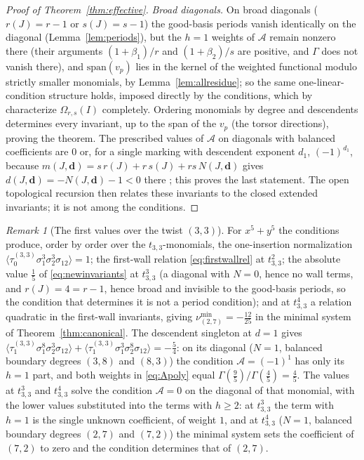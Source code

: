 \documentclass[11pt]{amsart}
\theoremstyle{definition}
\theoremstyle{remark}
\newtheorem{remark}[theorem]{Remark}
\newcommand{\Ascr}{\mathcal{A}}
\newcommand{\Om}{\Omega_{r,s}}
\begin{document}
\begin{proof}[Proof of Theorem~\ref{thm:effective}]
\emph{Broad diagonals.}
On broad
diagonals ($r(J)=r-1$ or $s(J)=s-1$) the good-basis periods vanish identically
on the diagonal (Lemma~\ref{lem:periods}), but the $h=1$ weights of $\Ascr$
remain nonzero there (their arguments $(1+\beta_1)/r$ and $(1+\beta_2)/s$ are
positive, and $\Gamma$ does not vanish there), and $\mathrm{span}(v_{p})$ lies in the
kernel of the weighted functional modulo strictly smaller monomials, by
Lemma~\ref{lem:allresidue}; so the same
one-linear-condition structure holds, imposed directly by the conditions,
which by \cite[Cor.~5.14]{GKT} characterize $\Om(I)$ completely. Ordering monomials by degree and descendents determines every
invariant, up to the span of the $v_{p}$ (the torsor directions), proving the
theorem.  The prescribed values of $\Ascr$ on diagonals with balanced
coefficients are $0$ or, for a single marking with descendent exponent
$d_1$, $(-1)^{d_1}$, because
$m(J,\mathbf d)=s\,r(J)+r\,s(J)+rs\,N(J,\mathbf d)$ gives
$d(J,\mathbf d)=-N(J,\mathbf d)-1<0$ there \cite[Def.~4.8]{GKT}; this proves
the last statement.  The open topological recursion \cite[Thm.~0.5]{GKT}
then relates these invariants to the closed extended invariants; it is not
among the conditions.
\end{proof}

\begin{remark}[The first values over the twist $(3,3)$]
\label{rem:tower}
For $x^{5}+y^{5}$ the conditions produce, order by order over the
$t_{3,3}$-monomials, the one-insertion normalization
$\langle\tau_{0}^{(3,3)}\sigma_{1}^{3}\sigma_{2}^{3}\sigma_{12}\rangle=1$; the
first-wall relation \eqref{eq:firstwallrel} at $t_{3,3}^{2}$; the absolute value
$\tfrac15$ of \eqref{eq:newinvariants} at $t_{3,3}^{3}$ (a diagonal with $N=0$,
hence no wall terms, and $r(J)=4=r{-}1$, hence broad and invisible to the good-basis
periods, so the condition that determines it is not a period condition); and at $t_{3,3}^{4}$
a relation quadratic in the first-wall invariants, giving
$\nu^{\min}_{(2,7)}=-\tfrac{12}{25}$ in the minimal system of
Theorem~\ref{thm:canonical}. The descendent singleton at $d=1$ gives
$\langle\tau_{1}^{(3,3)}\sigma_{1}^{8}\sigma_{2}^{3}\sigma_{12}\rangle
+\langle\tau_{1}^{(3,3)}\sigma_{1}^{3}\sigma_{2}^{8}\sigma_{12}\rangle
=-\tfrac54$: on its diagonal ($N=1$, balanced boundary degrees $(3,8)$ and $(8,3)$)
the condition $\Ascr=(-1)^1$ has only its $h=1$ part, and both weights in
\eqref{eq:Apoly} equal $\Gamma(\tfrac95)/\Gamma(\tfrac45)=\tfrac45$.  The
values at $t_{3,3}^{3}$ and $t_{3,3}^{4}$ solve the condition $\Ascr=0$ on the
diagonal of that monomial, with the lower values substituted into the terms
with $h\ge2$: at $t_{3,3}^{3}$ the term with $h=1$ is the single unknown
coefficient, of weight $1$, and at $t_{3,3}^{4}$ ($N=1$, balanced boundary
degrees $(2,7)$ and $(7,2)$) the minimal system sets the coefficient of
$(7,2)$ to zero and the condition determines that of $(2,7)$.
\end{remark}
\end{document}
